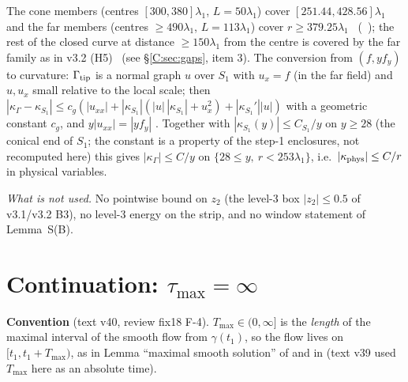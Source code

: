 \documentclass[11pt]{article}
\begin{document}
The cone members (centres $[300,380]\lambda_1$, $L=50\lambda_1$) cover $[251.44,428.56]\lambda_1$ and the far members (centres $\ge490\lambda_1$, $L=113\lambda_1$) cover $r\ge379.25\lambda_1$ \tC\ (\SZ\ ); the rest of the closed curve at distance $\ge150\lambda_1$ from the centre is covered by the far family as in v3.2 (H5) \tH\ (see \S\ref{C:sec:gaps}, item 3). The conversion from $(f,yf_y)$ to curvature: $\Gamma_{\rm tip}$ is a normal graph $u$ over $S_1$ with $u_x=f$ (in the far field) and $u,u_x$ small relative to the local scale; then $|\kappa_\Gamma-\kappa_{S_1}|\le c_g(|u_{xx}|+|\kappa_{S_1}|(|u|\,|\kappa_{S_1}|+u_x^2)+|\kappa_{S_1}'||u|)$ with a geometric constant $c_g$, and $y|u_{xx}|=|yf_y|$ \tP. Together with $|\kappa_{S_1}(y)|\le C_{S_1}/y$ on $y\ge28$ (the conical end of $S_1$; the constant is a property of the step-1 enclosures, not recomputed here) this gives $|\kappa_\Gamma|\le C/y$ on $\{28\le y,\ r<253\lambda_1\}$, i.e.\ $|\kappa_{\rm phys}|\le C/r$ in physical variables.

\noindent\emph{What is not used.} No pointwise bound on $z_2$ (the level-3 box $|z_2|\le0.5$ of v3.1/v3.2 B3), no level-3 energy on the strip, and no window statement of Lemma~S(B).

\section{Continuation: $\tau_{\max}=\infty$}\label{C:sec:cont}
\noindent\textbf{Convention} (text v40, review fix18 F-4). $T_{\max}\in(0,\infty]$ is the \emph{length} of the maximal interval of the smooth flow from $\gamma(t_1)$, so the flow lives on $[t_1,t_1+T_{\max})$, as in Lemma ``maximal smooth solution'' of  and in  (text v39 used $T_{\max}$ here as an absolute time).
\end{document}
